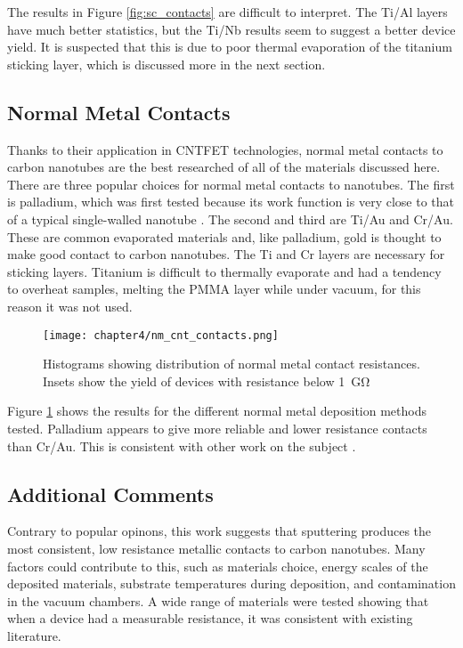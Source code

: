 The results in Figure \ref{fig:sc_contacts} are difficult to interpret. The Ti/Al layers have much better statistics, but the Ti/Nb results seem to suggest a better device yield. It is suspected that this is due to poor thermal evaporation of the titanium sticking layer, which is discussed more in the next section.

\subsection{Normal Metal Contacts}

Thanks to their application in CNTFET technologies, normal metal contacts to carbon nanotubes are the best researched of all of the materials discussed here. There are three popular choices for normal metal contacts to nanotubes. The first is palladium, which was first tested because its work function is very close to that of a typical single-walled  nanotube \cite{Javey2003, Jejurikar2010}. The second and third are Ti/Au and Cr/Au. These are common evaporated materials and, like palladium, gold is thought to make good contact to carbon nanotubes. The Ti and Cr layers are necessary for sticking layers. Titanium is difficult to thermally evaporate and had a tendency to overheat samples, melting the PMMA layer while under vacuum, for this reason it was not used. 

\begin{figure}
    \centering
    \texttt{[image: chapter4/nm\_cnt\_contacts.png]}
    \caption{Histograms showing distribution of normal metal contact resistances. Insets show the yield of devices with resistance below \SI{1}{\giga\ohm}}
    \label{fig:nm_contacts}
\end{figure}

Figure \ref{fig:nm_contacts} shows the results for the different normal metal deposition methods tested. Palladium appears to give more reliable and lower resistance contacts than Cr/Au. This is consistent with other work on the subject \cite{Javey2003}.

\subsection{Additional Comments}

Contrary to popular opinons, this work suggests that sputtering produces the most consistent, low resistance metallic contacts to carbon nanotubes. Many factors could contribute to this, such as materials choice, energy scales of the deposited materials, substrate temperatures during deposition, and contamination in the vacuum chambers. A wide range of materials were tested showing that when a device had a measurable resistance, it was consistent with existing literature. 

